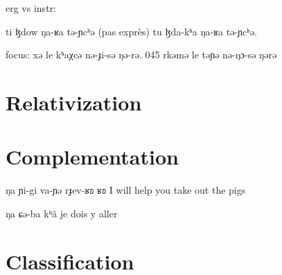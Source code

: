 \documentclass[oneside,a4paper,11pt]{article}
\begin{document}
erg vs instr:


	ti ɮdow ŋa-ʁa tə-ɲcʰə (pas exprès)
	tu ɮda-kʰa ŋa-ʁa tə-ɲcʰə.

focus:
xə le kʰaχcə nə-ɟi-sə ŋə-rə.
045	rkəmə le təɲə nə-ŋɔ-sə ŋərə
\section{Relativization}

\section{Complementation}  

  ŋa ɲi-gi va-ɲə rɟev-ʁʚ ʁʚ
  I will help you take out the pigs


 ŋa ɕə-ba kʰã
 je dois y aller
\section{Classification} \label{sec:classification}
 
 
  \citet{lai14person}



\end{document}
